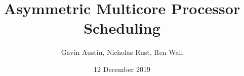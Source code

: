 \documentclass[12pt]{article}
\title{Asymmetric Multicore Processor Scheduling}
\author{Gavin Austin, Nicholas Rust, Ren Wall}
\date{12 December 2019}
\begin{document}
\maketitle

	
	
	
	\pagebreak
	
	
	
	
\clearpage
\pagebreak
{}

\end{document}
